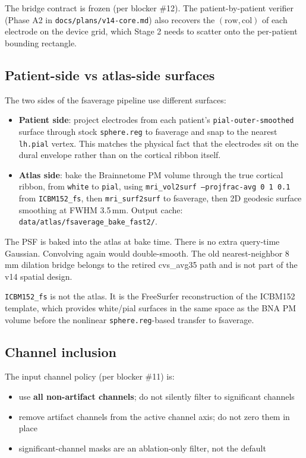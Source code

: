\documentclass[11pt,letterpaper]{article}
\begin{document}
The bridge contract is frozen (per blocker \#12). The patient-by-patient verifier (Phase A2 in \texttt{docs/plans/v14-core.md}) also recovers the $(\text{row}, \text{col})$ of each electrode on the device grid, which Stage 2 needs to scatter onto the per-patient bounding rectangle.

\subsection{Patient-side vs atlas-side surfaces}

The two sides of the fsaverage pipeline use different surfaces:
\begin{itemize}[leftmargin=2em, itemsep=0.2em]
\item \textbf{Patient side}: project electrodes from each patient's \texttt{pial-outer-smoothed} surface through stock \texttt{sphere.reg} to fsaverage and snap to the nearest \texttt{lh.pial} vertex. This matches the physical fact that the electrodes sit on the dural envelope rather than on the cortical ribbon itself.
\item \textbf{Atlas side}: bake the Brainnetome PM volume through the true cortical ribbon, from \texttt{white} to \texttt{pial}, using \texttt{mri\_vol2surf --projfrac-avg 0 1 0.1} from \texttt{ICBM152\_fs}, then \texttt{mri\_surf2surf} to fsaverage, then 2D geodesic surface smoothing at FWHM 3.5\,mm. Output cache: \texttt{data/atlas/fsaverage\_bake\_fast2/}.
\end{itemize}

The PSF is baked into the atlas at bake time. There is no extra query-time Gaussian. Convolving again would double-smooth. The old nearest-neighbor 8\,mm dilation bridge belongs to the retired cvs\_avg35 path and is not part of the v14 spatial design.

\texttt{ICBM152\_fs} is not the atlas. It is the FreeSurfer reconstruction of the ICBM152 template, which provides white/pial surfaces in the same space as the BNA PM volume before the nonlinear \texttt{sphere.reg}-based transfer to fsaverage.

\subsection{Channel inclusion}

The input channel policy (per blocker \#11) is:
\begin{itemize}[leftmargin=2em, itemsep=0.2em]
\item use \textbf{all non-artifact channels}; do not silently filter to significant channels
\item remove artifact channels from the active channel axis; do not zero them in place
\item significant-channel masks are an ablation-only filter, not the default
\end{itemize}
\end{document}
